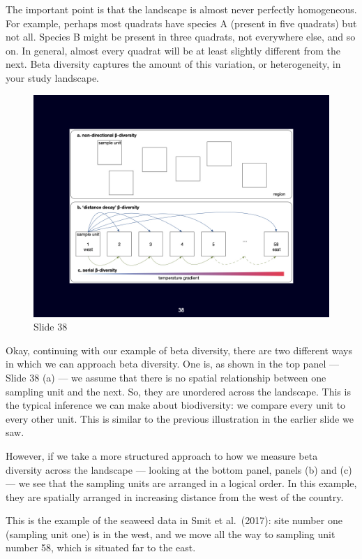 \documentclass[
  10pt,
]{book}
\begin{document}
The important point is that the landscape is almost never perfectly
homogeneous. For example, perhaps most quadrats have species A (present
in five quadrats) but not all. Species B might be present in three
quadrats, not everywhere else, and so on. In general, almost every
quadrat will be at least slightly different from the next. Beta
diversity captures the amount of this variation, or heterogeneity, in
your study landscape.

\begin{figure}[ht]
\centering
\includegraphics[width=0.8\linewidth]{../images/BDC334/BDC334-038.jpeg}
\caption*{Slide 38}
\end{figure}

Okay, continuing with our example of beta diversity, there are two
different ways in which we can approach beta diversity. One is, as shown
in the top panel --- Slide 38 (a) --- we assume that there is no spatial
relationship between one sampling unit and the next. So, they are
unordered across the landscape. This is the typical inference we can
make about biodiversity: we compare every unit to every other unit. This
is similar to the previous illustration in the earlier slide we saw.

However, if we take a more structured approach to how we measure beta
diversity across the landscape --- looking at the bottom panel, panels
(b) and (c) --- we see that the sampling units are arranged in a logical
order. In this example, they are spatially arranged in increasing
distance from the west of the country.

This is the example of the seaweed data in Smit et al.~(2017): site
number one (sampling unit one) is in the west, and we move all the way
to sampling unit number 58, which is situated far to the east.
\end{document}
